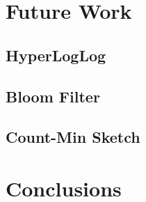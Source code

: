\documentclass[11pt,oneside,a4paper]{article}
\makeatletter
\def\cleardoublepage{\clearpage\if@twoside \ifodd\c@page\else%
\hbox{}%
\thispagestyle{empty}%
\clearpage%
\if@twocolumn\hbox{}\clearpage\fi\fi\fi}
\makeatother
\begin{document}
\section{Future Work}
\subsection{HyperLogLog}
\subsection{Bloom Filter}
\subsection{Count-Min Sketch}
\section{Conclusions}
\cleardoublepage
{}

\cleardoublepage




\end{document}
